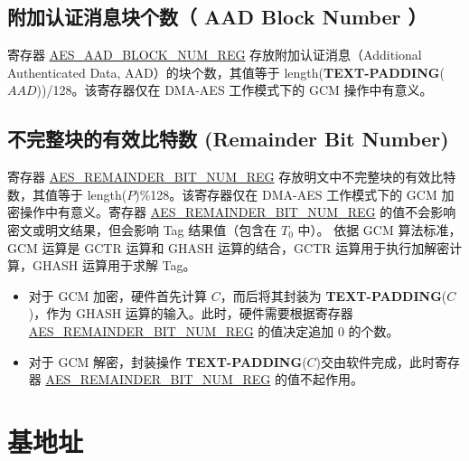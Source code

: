 \documentclass[main\_\_CN.tex]{subfiles}
\begin{document}
\subsection{ 附加认证消息块个数（ AAD Block Number ）}\label{Label AAD Block Number}

寄存器 \hyperref[regdesc:AESAADBLOCKNUMREG]{AES\_AAD\_BLOCK\_NUM\_REG} 存放附加认证消息（Additional Authenticated Data, AAD）的块个数，其值等于 length({\bfseries TEXT-PADDING}($AAD$))/128。该寄存器仅在 DMA-AES 工作模式下的 GCM 操作中有意义。

\subsection{ 不完整块的有效比特数 (Remainder Bit Number)}\label{Label Remainder Bit Number}

寄存器 \hyperref[regdesc:AESREMAINDERBITNUMREG]{AES\_REMAINDER\_BIT\_NUM\_REG} 存放明文中不完整块的有效比特数，其值等于 length($P$)\%128。该寄存器仅在 DMA-AES 工作模式下的 GCM 加密操作中有意义。寄存器 \hyperref[regdesc:AESREMAINDERBITNUMREG]{AES\_REMAINDER\_BIT\_NUM\_REG} 的值不会影响密文或明文结果，但会影响 Tag 结果值（包含在 $T_{0}$ 中）。
依据 GCM 算法标准，GCM 运算是 GCTR 运算和 GHASH 运算的结合，GCTR 运算用于执行加解密计算，GHASH 运算用于求解 Tag。

\begin{itemize}
    \item 对于 GCM 加密，硬件首先计算 $C$，而后将其封装为 {\bfseries TEXT-PADDING}($C$)，作为 GHASH 运算的输入。此时，硬件需要根据寄存器 \hyperref[regdesc:AESREMAINDERBITNUMREG]{AES\_REMAINDER\_BIT\_NUM\_REG} 的值决定追加 0 的个数。
    \item 对于 GCM 解密，封装操作 {\bfseries TEXT-PADDING}($C$)交由软件完成，此时寄存器 \hyperref[regdesc:AESREMAINDERBITNUMREG]{AES\_REMAINDER\_BIT\_NUM\_REG} 的值不起作用。
\end{itemize}


\section{ 基地址 } \label{Label AES MODULE ENTRY}
\end{document}
